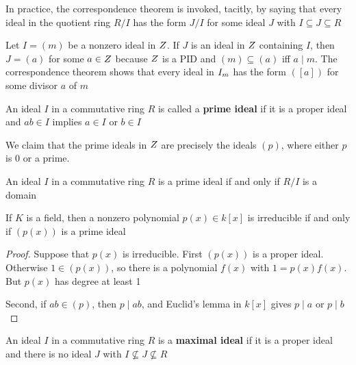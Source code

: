 \documentclass[11pt]{article}
\begin{document}
In practice, the correspondence theorem is invoked, tacitly, by saying that
every ideal in the quotient ring \(R/I\) has the form \(J/I\) for some ideal
\(J\) with \(I\subseteq J\subseteq R\)

\begin{examplle}[]
Let \(I=(m)\) be a nonzero ideal in \(\relax{Z}\). If \(J\) is an ideal in \(\relax{Z}\)
containing \(I\), then \(J=(a)\) for some \(a\in\relax{Z}\) because \(\relax{Z}\) is a PID
and \((m)\subseteq(a)\) iff \(a\mid m\). The correspondence theorem shows
that every ideal in \(\relax{I}_m\) has the form \(([a])\) for some divisor \(a\) of \(m\)
\end{examplle}

\begin{definition}[]
An ideal \(I\) in a commutative ring \(R\) is called a \textbf{prime ideal} if it is a
proper ideal and \(ab\in I\) implies \(a\in I\) or \(b\in I\)
\end{definition}

\begin{examplle}[]
We claim that the prime ideals in \(\relax{Z}\) are precisely the ideals \((p)\),
where either \(p\) is 0 or a prime.
\end{examplle}

\begin{proposition}[]
An ideal \(I\) in a commutative ring \(R\) is a prime ideal if and only if
\(R/I\) is a domain
\end{proposition}

\begin{proposition}[]
If \(K\) is a field, then a nonzero polynomial \(p(x)\in k[x]\) is irreducible
if and only if \((p(x))\) is a prime ideal
\end{proposition}

\begin{proof}
Suppose that \(p(x)\) is irreducible. First \((p(x))\) is a proper ideal.
Otherwise \(1\in (p(x))\), so there is a polynomial \(f(x)\) with
\(1=p(x)f(x)\). But \(p(x)\) has degree at least 1

Second, if \(ab\in(p)\), then \(p\mid ab\), and Euclid's lemma in \(k[x]\)
gives \(p\mid a\) or \(p\mid b\)
\end{proof}

\begin{definition}[]
An ideal \(I\) in a commutative ring \(R\) is a \textbf{maximal ideal} if it is a proper
ideal and there is no ideal \(J\) with \(I\not\subseteq J\not\subseteq R\)
\end{definition}
\end{document}
